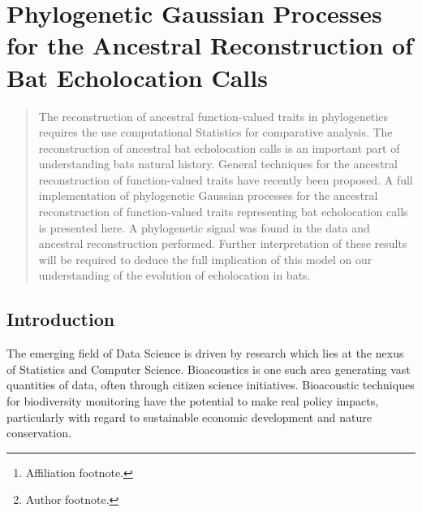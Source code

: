 \documentclass[wsdraft]{ws-rv9x6} %
\begin{document}
\chapter[Ancestral Reconstruction of Bat Echolocation Calls]{Phylogenetic Gaussian Processes for the Ancestral Reconstruction of Bat Echolocation Calls}\label{ra_ch1}

\author[J.P. Meagher et al.]{J.P. Meagher, T. Damoulas, K.E. Jones, and M. Girolami\footnote{Author footnote.}}

\address{Department of Statistics,\\
University of Warwick, \\
J.Meagher@Warwick.ac.uk\footnote{Affiliation footnote.}}

\begin{abstract}
The reconstruction of ancestral function-valued traits in phylogenetics requires the use computational Statistics for comparative analysis. The reconstruction of ancestral bat echolocation calls is an important part of understanding bats natural history. General techniques for the ancestral reconstruction of function-valued traits have recently been proposed. A full implementation of phylogenetic Gaussian processes for the ancestral reconstruction of function-valued traits representing bat echolocation calls is presented here. A phylogenetic signal was found in the data and ancestral reconstruction performed. Further interpretation of these results will be required to deduce the full implication of this model on our understanding of the evolution of echolocation in bats.
\end{abstract}
\body

\section{Introduction}
\label{sec:intro}
The emerging field of Data Science is driven by research which lies at the nexus of Statistics and Computer Science. Bioacoustics is one such area generating vast quantities of data, often through citizen science initiatives. \cite{allen2006citizen} \cite{pettorelli2013indicator} Bioacoustic techniques for biodiversity monitoring \cite{stathopoulos2017bat} \cite{damoulas2010bayesian} have the potential to make real policy impacts, particularly with regard to sustainable economic development and nature conservation.
\end{document}
